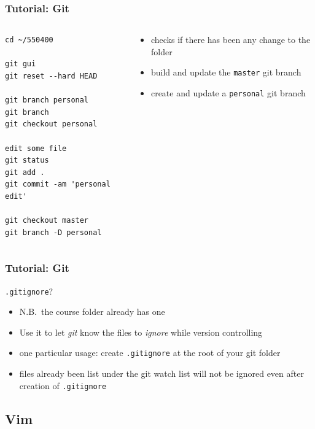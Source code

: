 \begin{frame}[fragile]
    \frametitle{Tutorial: Git}
    \begin{columns}
        \begin{column}{0.5\textwidth}
    \begin{lstlisting}
cd ~/550400

git gui
git reset --hard HEAD

git branch personal
git branch
git checkout personal

edit some file 
git status 
git add . 
git commit -am 'personal edit'

git checkout master
git branch -D personal
    \end{lstlisting}
        \end{column}
        \begin{column}{0.5\textwidth}
    \begin{itemize}
        \item checks if there has been any change to the folder
        \item build and update the \texttt{master} git branch
        \item create and update a \texttt{personal} git branch
    \end{itemize}
        \end{column}
    \end{columns} 
\end{frame}



\begin{frame}
    \frametitle{Tutorial: Git}
    \texttt{.gitignore}?
    \vskip0.1in
    \begin{itemize}
        \item N.B.~the course folder already has one 
        \item Use it to let \emph{git} know the files to \emph{ignore} while
            version controlling
        \item one particular usage: create \texttt{.gitignore} at the root of
            your git folder 
        \item files already been list under the git watch list will not be
            ignored even after creation of \texttt{.gitignore} 
    \end{itemize}
\end{frame}

\subsection{Vim}

